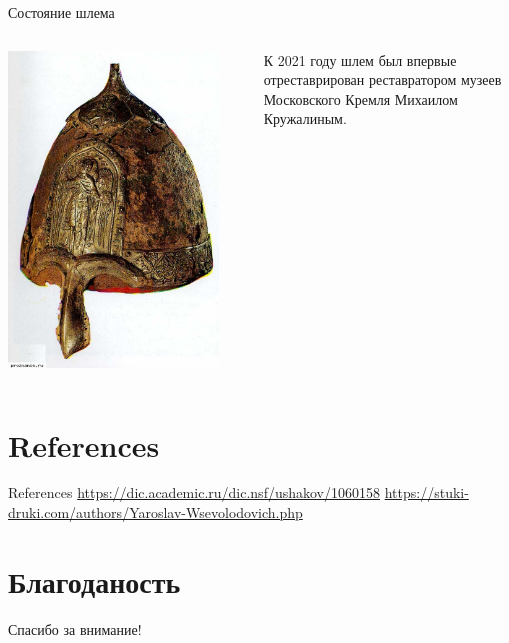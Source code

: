 \begin{frame}{Состояние шлема}
	\begin{columns}
		\begin{column}{0.45\textwidth}
			\includegraphics[width=0.9\textwidth]{images/shlem-3.jpg}
		\end{column}
		\begin{column}{0.45\textwidth}

			К 2021 году шлем был впервые отреставрирован реставратором музеев Московского Кремля Михаилом Кружалиным.

		\end{column}
	\end{columns}
\end{frame}

\section{References}

\begin{frame}[t]{References}
	\printbibliography
	\url{https://dic.academic.ru/dic.nsf/ushakov/1060158}
	\url{https://stuki-druki.com/authors/Yaroslav-Wsevolodovich.php}
\end{frame}

\section{Благоданость}
\begin{frame}
	\centering
	\huge
	Спасибо за внимание!
\end{frame}


